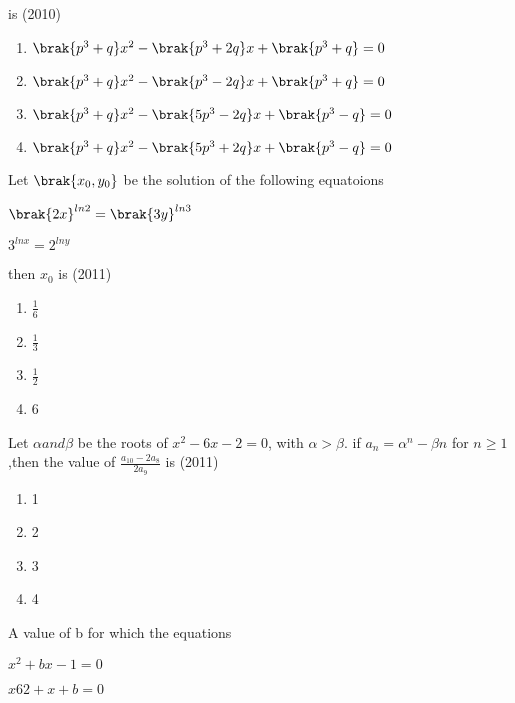 is \hfill (2010)
\begin{enumerate}
    \item $\brak{p^{3}+q}x^{2}-\brak{p^{3}+2q}x+\brak{p^{3}+q}=0$
    \item $\brak{p^{3}+q}x^{2}-\brak{p^{3}-2q}x+\brak{p^{3}+q}=0$
    \item $\brak{p^{3}+q}x^{2}-\brak{5p^{3}-2q}x+\brak{p^{3}-q}=0$
    \item $\brak{p^{3}+q}x^{2}-\brak{5p^{3}+2q}x+\brak{p^{3}-q}=0$
\end{enumerate}
\item Let $\brak{x_0,y_0}$ be the solution of the following equatoions

$\brak{2x}^{ln2}=\brak{3y}^{ln3}$

$3^{lnx}=2^{lny}$

then $x_{0}$ is \hfill (2011)
\begin{multicols}{4}
\begin{enumerate}
    \item $\frac{1}{6}$
    \item $\frac{1}{3}$
    \item $\frac{1}{2}$
    \item 6
\end{enumerate}
    
\end{multicols}
\item Let $\alpha and \beta$ be the roots of $x^{2}-6x-2=0$, with $\alpha>\beta$. if $a_{n}=\alpha^{n}-\beta{n}$ for $n\geq 1$,then the value of $\frac{a_{10}-2a_{8}}{2a_{9}}$ is \hfill (2011)
\begin{multicols}{4}
\begin{enumerate}
    \item 1
    \item 2
    \item 3
    \item 4    
\end{enumerate}
    
\end{multicols}
\item A value of b for which the equations 

$x^{2}+bx-1=0$

$x6{2}+x+b=0$


